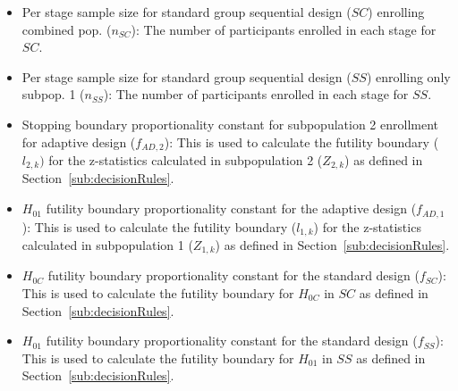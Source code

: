 \documentclass[article]{jss}
\begin{document}
\begin{itemize}

\item Per stage sample size for standard group sequential design ($SC$) enrolling combined pop. ($n_{SC}$): The number of participants enrolled in each stage for $SC$.

\item Per stage sample size for standard group sequential design ($SS$) enrolling only subpop. 1 ($n_{SS}$): The number of participants enrolled in each stage for $SS$.

\item Stopping boundary proportionality constant for subpopulation 2 enrollment for adaptive design ($f_{AD,2}$): This is used to calculate the futility boundary ($l_{2,k})$ for the z-statistics calculated in subpopulation 2 ($Z_{2,k}$) as defined in Section~\ref{sub:decisionRules}.

\item $H_{01}$ futility boundary proportionality constant for the adaptive design ($f_{AD,1}$):  This is used to calculate the futility boundary ($l_{1,k}$) for the z-statistics calculated in subpopulation 1 ($Z_{1,k}$) as defined in Section~\ref{sub:decisionRules}.

\item $H_{0C}$ futility boundary proportionality constant for the standard design ($f_{SC}$): This is used to calculate the futility boundary for $H_{0C}$ in $SC$ as defined in Section~\ref{sub:decisionRules}. %

\item $H_{01}$ futility boundary proportionality constant for the standard design ($f_{SS}$):  This is used to calculate the futility boundary for $H_{01}$ in $SS$ as defined in Section~\ref{sub:decisionRules}. %



\end{itemize}
\end{document}
